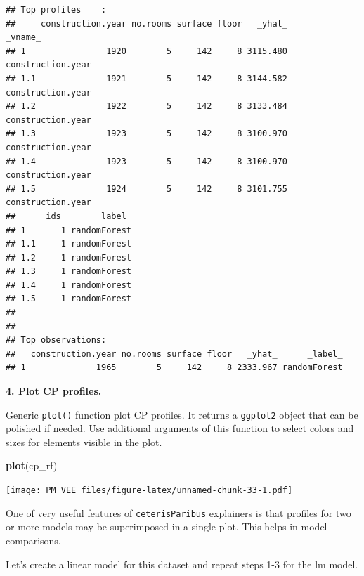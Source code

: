 \documentclass[]{krantz}
\newenvironment{Shaded}{\begin{snugshade}}{\end{snugshade}}
\newcommand{\DataTypeTok}[1]{\textcolor[rgb]{0.13,0.29,0.53}{#1}}
\newcommand{\KeywordTok}[1]{\textcolor[rgb]{0.13,0.29,0.53}{\textbf{#1}}}
\newcommand{\NormalTok}[1]{#1}
\newcommand{\OperatorTok}[1]{\textcolor[rgb]{0.81,0.36,0.00}{\textbf{#1}}}
\newcommand{\StringTok}[1]{\textcolor[rgb]{0.31,0.60,0.02}{#1}}
\theoremstyle{definition}
\theoremstyle{definition}
\theoremstyle{definition}
\theoremstyle{remark}
\begin{document}
\begin{verbatim}
## Top profiles    : 
##     construction.year no.rooms surface floor   _yhat_           _vname_
## 1                1920        5     142     8 3115.480 construction.year
## 1.1              1921        5     142     8 3144.582 construction.year
## 1.2              1922        5     142     8 3133.484 construction.year
## 1.3              1923        5     142     8 3100.970 construction.year
## 1.4              1923        5     142     8 3100.970 construction.year
## 1.5              1924        5     142     8 3101.755 construction.year
##     _ids_      _label_
## 1       1 randomForest
## 1.1     1 randomForest
## 1.2     1 randomForest
## 1.3     1 randomForest
## 1.4     1 randomForest
## 1.5     1 randomForest
## 
## 
## Top observations:
##   construction.year no.rooms surface floor   _yhat_      _label_
## 1              1965        5     142     8 2333.967 randomForest
\end{verbatim}

\textbf{4. Plot CP profiles.}

Generic \texttt{plot()} function plot CP profiles. It returns a
\texttt{ggplot2} object that can be polished if needed. Use additional
arguments of this function to select colors and sizes for elements
visible in the plot.

\begin{Shaded}
\begin{Highlighting}[]
\KeywordTok{plot}\NormalTok{(cp_rf) }
\end{Highlighting}
\end{Shaded}

\texttt{[image: PM\_VEE\_files/figure-latex/unnamed-chunk-33-1.pdf]}

One of very useful features of \texttt{ceterisParibus} explainers is
that profiles for two or more models may be superimposed in a single
plot. This helps in model comparisons.

Let's create a linear model for this dataset and repeat steps 1-3 for
the lm model.

\begin{Shaded}
\end{Shaded}
\end{document}
